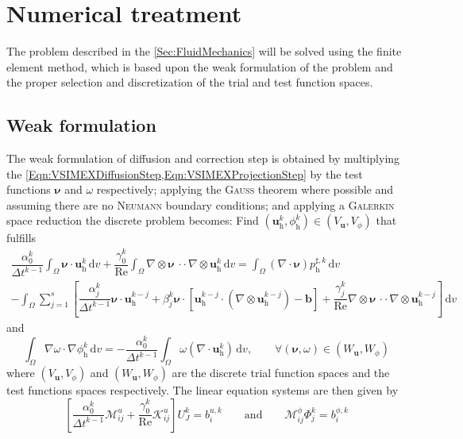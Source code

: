 \documentclass[]{scrartcl}
\renewcommand{\d}{\,\mathrm{d}}
\newcommand{\bs}[1]{\boldsymbol{#1}}
\newcommand{\cdott}{\, {\cdot}{\cdot}\,}
\begin{document}
\section{Numerical treatment}
The problem described in the \cref{Sec:FluidMechanics} will be solved using the finite element method, which is based upon the weak formulation of the problem and the proper selection and discretization of the trial and test function spaces.
\subsection{Weak formulation}
The weak formulation of diffusion and correction step is obtained by multiplying the \cref{Eqn:VSIMEXDiffusionStep,Eqn:VSIMEXProjectionStep} by the test functions $\bs{\nu}$ and $\omega$ respectively; applying the \textsc{Gauss} theorem where possible and assuming there are no \textsc{Neumann} boundary conditions; and applying a \textsc{Galerkin} space reduction the discrete problem becomes: Find $(\bs{u}^k_\textrm{h}, \phi^k_\textrm{h}) \in (V_{\bs{u}}, V_\phi)$ that fulfills
\begin{equation*}
\begin{split}
\dfrac{\alpha_0^k}{\Delta t^{k-1}} 
\int_{\Omega}
\bs{\nu} \cdot \bs{u}^k_\textrm{h}
\d v 
+ 
\dfrac{\gamma_0^k}{\textrm{Re}}
\int_{\Omega} 
\nabla \otimes \bs{\nu} \cdott \nabla \otimes \bs{u}^k_\textrm{h}
\d v
=
\int_{\Omega}
(\nabla \cdot \bs{\nu}) p^{\sharp, k}_\textrm{h}
\d v \\
-
\int_{\Omega}
\sum_{j=1}^{s} 
\left[
\dfrac{\alpha_j^k}{\Delta t^{k-1}} \bs{\nu} \cdot \bs{u}^{k-j}_\textrm{h}
+
\beta_j^k \bs{\nu} \cdot \left[ \bs{u}^{k-j}_\textrm{h} \cdot (\nabla \otimes \bs{u}^{k-j}_\textrm{h} ) - \bs{b} \right]
+
\dfrac{\gamma_j^k}{\textrm{Re}} \nabla \otimes \bs{\nu} \cdott \nabla \otimes \bs{u}^{k-j}_\textrm{h}
\right]
\d v
\end{split} 	
\end{equation*}
and 
\begin{equation*}
	\int_{\Omega}
	\nabla \omega \cdot \nabla \phi^k_\textrm{h} 
	\d v
	= 
	- \dfrac{\alpha_0^k}{\Delta t^{k-1}} 
	\int_{\Omega}
	\omega (\nabla \cdot \bs{u}^k_\textrm{h})
	\d v,
	\qquad
	\forall (\bs{\nu}, \omega) \in (W_{\bs{u}}, W_\phi)
\end{equation*}
where $(V_{\bs{u}}, V_\phi)$ and $(W_{\bs{u}}, W_\phi)$ are the discrete trial function spaces and the test functions spaces respectively. The linear equation systems are then given by
\begin{equation*}
	\left[
	\dfrac{\alpha_0^k}{\Delta t^{k-1}} 
	\mathcal{M}^u_{ij}
	+
	\dfrac{\gamma_0^k}{\textrm{Re}}
	\mathcal{K}^u_{ij}
	\right]
	U^k_J
	= 
	b^{u, k}_i
	\qquad \textrm{and} \qquad
	\mathcal{M}^\phi_{ij} \Phi^k_j = b^{\phi, k}_i
\end{equation*}
\end{document}

